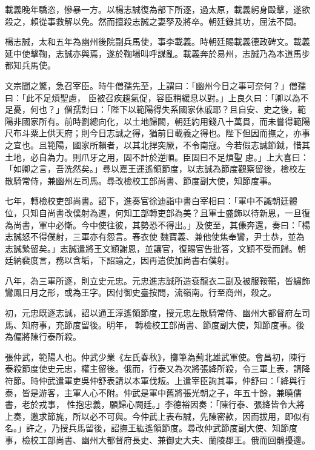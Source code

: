 \begin{pinyinscope}
 載義晚年驕恣，慘暴一方。以楊志誠復為部下所逐，過太原，載義躬身毆擊，遂欲殺之，賴從事救解以免。然而擅殺志誠之妻孥及將卒。朝廷錄其功，屈法不問。



 楊志誠，太和五年為幽州後院副兵馬使，事李載義。時朝廷賜載義德政碑文。載義延中使擊鞠，志誠亦與焉，遂於鞠場叫呼謀亂。載義奔於易州，志誠乃為本道馬步都知兵馬使。



 文宗聞之驚，急召宰臣。時牛僧孺先至，上謂曰：「幽州今日之事可奈何？」僧孺曰：「此不足煩聖慮，
 臣被召疾趨氣促，容臣稍緩息以對。」上良久曰：「卿以為不足憂，何也？」僧孺對曰：「陛下以範陽得失系國家休戚耶？且自安、史之後，範陽非國家所有。前時劉總向化，以土地歸闕，朝廷約用錢八十萬貫，而未嘗得範陽尺布斗粟上供天府；則今日志誠之得，猶前日載義之得也。陛下但因而撫之，亦事之宜也。且範陽，國家所賴者，以其北捍突厥，不令南寇。今若假志誠節鉞，惜其土地，必自為力。則爪牙之用，固不計於逆順。臣固曰不足煩聖
 慮。」上大喜曰：「如卿之言，吾洗然矣。」尋以嘉王運遙領節度，以志誠為節度觀察留後，檢校左散騎常侍，兼幽州左司馬。尋改檢校工部尚書、節度副大使，知節度事。



 七年，轉檢校吏部尚書。詔下，進奏官徐迪詣中書白宰相曰：「軍中不識朝廷體位，只知自尚書改僕射為遷，何知工部轉吏部為美？且軍士盛飾以待新恩，一旦復為尚書，軍中必慚。今中使往彼，其勢恐不得出。」及使至，其傔奔還，奏曰：「楊志誠怒不得僕射，三軍亦有怨言。春衣使
 魏寶義、兼他使焦奉鸞，尹士恭，並為志誠縶留矣。」志誠遣將王文穎謝恩，並讓官，復賜官告批答，文穎不受而歸。朝廷納裴度言，務以含垢，下詔諭之，因再遣使加尚書右僕射。



 八年，為三軍所逐，則立史元忠。元忠進志誠所造袞龍衣二副及被服鞍韉，皆繡飾鸞鳳日月之形，或為王字。因付御史臺按問，流嶺南。行至商州，殺之。



 初，元忠既逐志誠，詔以通王淳遙領節度，授元忠左散騎常侍、幽州大都督府左司馬、知府事，充節度留後。明年，
 轉檢校工部尚書、節度副大使，知節度事。後為偏將陳行泰所殺。



 張仲武，範陽人也。仲武少業《左氏春秋》，擲筆為薊北雄武軍使。會昌初，陳行泰殺節度使史元忠，權主留後。俄而，行泰又為次將張絳所殺，令三軍上表，請降符節。時仲武遣軍吏吳仲舒表請以本軍伐叛。上遣宰臣詢其事，仲舒曰：「絳與行泰，皆是游客，主軍人心不附。仲武是軍中舊將張光朝之子，年五十餘，兼曉儒書，老於戎事，
 性抱忠義，願歸心闕廷。」李德裕因奏：「陳行泰、張絳皆令大將上奏，邀求節旄，所以必不可與。今仲武上表布誠，先陳密款，因而拔用，即似有名。」許之，乃授兵馬留後，詔撫王紘遙領節度。尋改仲武節度副大使、知節度事，檢校工部尚書、幽州大都督府長史、兼御史大夫、蘭陵郡王。俄而回鶻擾邊。




\end{pinyinscope}
